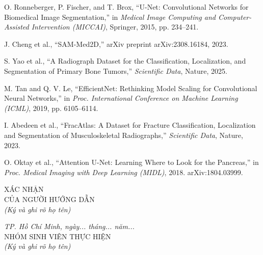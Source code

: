 \pagebreak


\medskip
\begin{enumerate}[label={[\arabic*]}]

    \item O. Ronneberger, P. Fischer, and T. Brox, ``U-Net: Convolutional Networks for Biomedical Image Segmentation,'' in \textit{Medical Image Computing and Computer-Assisted Intervention (MICCAI)}, Springer, 2015, pp. 234--241.

    \item J. Cheng et al., ``SAM-Med2D,'' arXiv preprint arXiv:2308.16184, 2023.

    \item S. Yao et al., ``A Radiograph Dataset for the Classification, Localization, and Segmentation of Primary Bone Tumors,'' \textit{Scientific Data}, Nature, 2025.

    \item M. Tan and Q. V. Le, ``EfficientNet: Rethinking Model Scaling for Convolutional Neural Networks,'' in \textit{Proc. International Conference on Machine Learning (ICML)}, 2019, pp. 6105--6114.

    \item I. Abedeen et al., ``FracAtlas: A Dataset for Fracture Classification, Localization and Segmentation of Musculoskeletal Radiographs,'' \textit{Scientific Data}, Nature, 2023.

    \item O. Oktay et al., ``Attention U-Net: Learning Where to Look for the Pancreas,'' in \textit{Proc. Medical Imaging with Deep Learning (MIDL)}, 2018. arXiv:1804.03999.

\end{enumerate}

\vspace{0.5cm}

\noindent
\begin{minipage}[t]{0.45\textwidth}
    \centering
    \footnotesize XÁC NHẬN\\
    \footnotesize CỦA NGƯỜI HƯỚNG DẪN\\[0.1cm]
    \footnotesize\textit{(Ký và ghi rõ họ tên)}\\[1.2cm]
\end{minipage}
\hfill
\begin{minipage}[t]{0.50\textwidth}
    \centering
    \footnotesize\textit{TP. Hồ Chí Minh, ngày... tháng... năm...}\\
    \footnotesize NHÓM SINH VIÊN THỰC HIỆN\\[0.1cm]
    \footnotesize\textit{(Ký và ghi rõ họ tên)}\\[1.2cm]
\end{minipage}